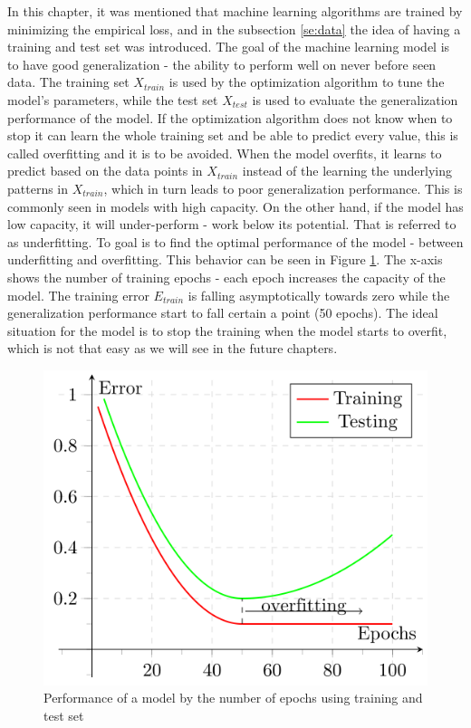 \documentclass[times, utf8, diplomski]{fer}
\begin{document}
In this chapter, it was mentioned that machine learning algorithms are trained by minimizing the empirical loss, and in the subsection \ref{se:data} the idea of having a training and test set was introduced. The goal of the machine learning model is to have good generalization - the ability to perform well on never before seen data. The training set $X_{train}$ is used by the optimization algorithm to tune the model's parameters, while the test set $X_{test}$ is used to evaluate the generalization performance of the model. If the optimization algorithm does not know when to stop it can learn the whole training set and be able to predict every value, this is called overfitting and it is to be avoided. When the model overfits, it learns to predict based on the data points in $X_{train}$ instead of the learning the underlying patterns in $X_{train}$, which in turn leads to poor generalization performance. This is commonly seen in models with high capacity. On the other hand, if the model has low capacity, it will under-perform - work below its potential. That is referred to as underfitting. To goal is to find the optimal performance of the model - between underfitting and overfitting. This behavior can be seen in Figure \ref{fig:overfitting}. The x-axis shows the number of training epochs - each epoch increases the capacity of the model. The training error $E_{train}$ is falling asymptotically towards zero while the generalization performance start to fall certain a point (50 epochs). The ideal situation for the model is to stop the training when the model starts to overfit, which is not that easy as we will see in the future chapters.


\begin{figure}
  \includegraphics[scale=0.43]{figures/overfitting.png}
  \centering
  \caption{Performance of a model by the number of epochs using training and test set}
  \label{fig:overfitting}
\end{figure}
\end{document}

